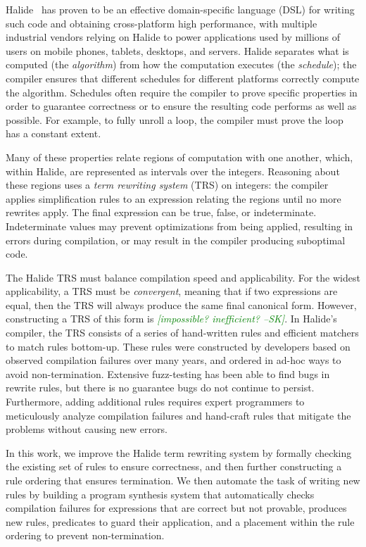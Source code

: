 \documentclass[sigplan,review,anonymous]{acmart}\settopmatter{printfolios=true,printccs=false,printacmref=false}
\newcommand{\sak}[1]{\textcolor{green}{\textit{[{#1} --SK]}}}
\begin{document}
Halide~\cite{siggraph2012jrk, pldi2013jrk} has proven to be an effective
domain-specific language (DSL) for writing such code and obtaining cross-platform
high performance, with multiple industrial vendors relying on Halide to power
applications used by millions of users on mobile phones, tablets, desktops, and
servers.  Halide separates what is computed (the \textit{algorithm}) from how
the computation executes (the \textit{schedule}); the compiler ensures that
different schedules for different platforms correctly compute the algorithm.
Schedules often require the compiler to prove specific properties in order
to guarantee correctness or to ensure the resulting code performs as well
as possible.  For example, to fully unroll a loop, the compiler must prove
the loop has a constant extent.

Many of these properties relate regions of computation with one another,
which, within Halide, are represented as intervals over the integers.
Reasoning about these regions uses a \textit{term rewriting system}
(TRS) on integers: the compiler applies simplification rules to an expression relating
the regions until no more rewrites apply.  The final expression can be
true, false, or indeterminate.  Indeterminate values may prevent optimizations
from being applied, resulting in errors during compilation, or may result
in the compiler producing suboptimal code.

The Halide TRS must balance compilation speed and applicability.  For the widest applicability,
a TRS must be \textit{convergent}, meaning that if two expressions are equal, then the TRS
will always produce the same final canonical form.  However, constructing a TRS of this form
is \sak{impossible? inefficient?}.  In Halide's compiler, the TRS consists of a series of
hand-written rules and efficient matchers to match rules bottom-up.  These rules were constructed
by developers based on observed compilation failures over many years, and ordered in ad-hoc ways
to avoid non-termination.  Extensive fuzz-testing has been able to find bugs in rewrite rules,
but there is no guarantee bugs do not continue to persist.  Furthermore, adding additional
rules requires expert programmers to meticulously analyze compilation failures and hand-craft
rules that mitigate the problems without causing new errors.

In this work, we improve the Halide term rewriting system by  formally checking the existing
set of rules to ensure correctness, and then further constructing a rule ordering that 
ensures termination.  We then automate the task of writing new rules by building a program
synthesis system that automatically checks compilation failures for expressions that are
correct but not provable, produces new rules, predicates to guard their application, and
a placement within the rule ordering to prevent non-termination.
\end{document}
